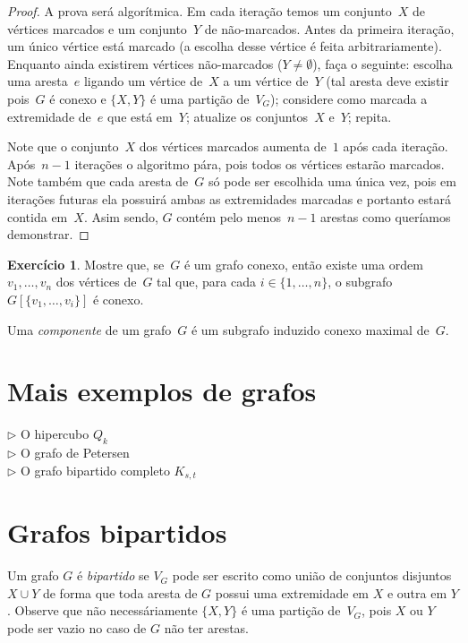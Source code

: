 \documentclass[12pt, a4paper]{article}
\theoremstyle{definition}
\newtheorem{exer}{Exercício}
\begin{document}
\begin{proof}
A prova será algorítmica. Em cada iteração temos um conjunto~$X$ de vértices marcados e um conjunto~$Y$ de não-marcados. Antes da primeira iteração, um único vértice está marcado (a escolha desse vértice é feita arbitrariamente). Enquanto ainda existirem vértices não-marcados ($Y \neq \emptyset$), faça o seguinte: escolha uma aresta~$e$ ligando um vértice de~$X$ a um vértice de~$Y$ (tal aresta deve existir pois~$G$ é conexo e $\{X,Y\}$ é uma partição de~$V_G$); considere como marcada a extremidade de~$e$ que está em~$Y$; atualize os conjuntos~$X$ e~$Y$; repita.

Note que o conjunto~$X$ dos vértices marcados aumenta de~$1$ após cada iteração. Após~$n - 1$ iterações o algoritmo pára, pois todos os vértices estarão marcados. Note também que cada aresta de~$G$ só pode ser escolhida uma única vez, pois em iterações futuras
ela possuirá ambas as extremidades marcadas e portanto estará contida em~$X$. Asim sendo, $G$ contém pelo menos~$n - 1$ arestas como queríamos demonstrar.
\end{proof}

\begin{exer}
Mostre que, se~$G$ é um grafo conexo, então existe uma ordem~$v_1, \dots, v_n$ dos vértices de~$G$ tal que, para cada $i \in \{1,\dots,n\}$, o subgrafo $G[\{v_1,\dots,v_i\}]$ %
é conexo.
\end{exer}

Uma \emph{componente} de um grafo~$G$ é um subgrafo induzido conexo maximal de~$G$. 


\section{Mais exemplos de grafos}

$\rhd$ O hipercubo $Q_k$\\
$\rhd$ O grafo de Petersen\\
$\rhd$ O grafo bipartido completo $K_{s,t}$


\section {Grafos bipartidos}

Um grafo $G$ é \emph{bipartido} se $V_G$ pode ser escrito como união de conjuntos disjuntos $X \cup Y$ de forma que toda aresta de $G$ possui uma extremidade em $X$ e outra em $Y$. Observe que não necessáriamente $\{X,Y\}$ é uma partição de~$V_G$, pois $X$ ou $Y$ pode ser vazio no caso de $G$ não ter arestas.
\end{document}
